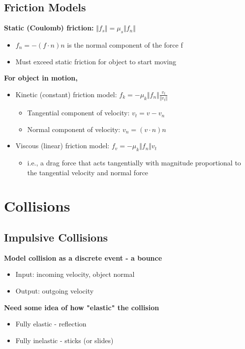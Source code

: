 \documentclass{article}
\begin{document}
\subsection*{Friction Models}
\textbf{Static (Coulomb) friction:} $\Vert f_s \Vert = \mu_s \Vert f_n \Vert$
\begin{itemize}
    \item $f_n = -(f \cdot n) n$ is the normal component of the force f
    \item Must exceed static friction for object to start moving
\end{itemize}
\textbf{For object in motion,}
\begin{itemize}
    \item Kinetic (constant) friction model: $f_k = -\mu_k \Vert f_n\Vert \frac{v_t}{\Vert v_t \Vert}$
    \begin{itemize}
        \item Tangential component of velocity: $v_t = v - v_n$
        \item Normal component of velocity: $v_n = (v \cdot n)n$
    \end{itemize}
    \item Viscous (linear) friction model: $f_v = -\mu_k \Vert f_n \Vert v_t$
    \begin{itemize}
        \item i.e., a drag force that acts tangentially with magnitude proportional to the tangential velocity and normal force
    \end{itemize}
\end{itemize}
\pagebreak
\section*{Collisions}
\subsection*{Impulsive Collisions}
\textbf{Model collision as a discrete event - a bounce}
\begin{itemize}
    \item Input: incoming velocity, object normal
    \item Output: outgoing velocity
\end{itemize}
\textbf{Need some idea of how "elastic" the collision}
\begin{itemize}
    \item Fully elastic - reflection
    \item Fully inelastic - sticks (or slides)
\end{itemize}
\end{document}
